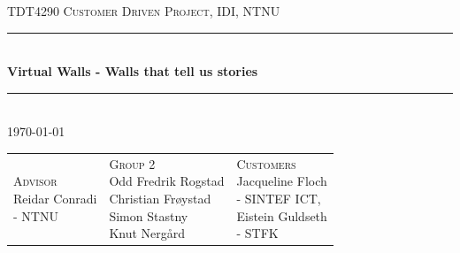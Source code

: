 \documentclass[11pt]{book}
\begin{document}
\newcommand{\fullprojectname}[0]{Virtual Walls - Walls that tell us stories}
\newcommand{\shortprojectname}[0]{Virtual Walls}
\newcommand{\systemname}[0]{StedR}
\newcommand{\wallentitys}[0]{place}
\newcommand{\wallentityp}[0]{places}
\newcommand{\wallentitypcap}[0]{Places}

\frontmatter

\begin{titlepage}
    \color{white}
    \begin{center}
        
        
        \textsc{\Large TDT4290 Customer Driven Project, IDI, NTNU}
        \\[0.5cm]
        
        \rule{\linewidth}{0.5mm}
        \\[1cm]
        
        \textbf{\LARGE \fullprojectname}
        \\[1cm]
        
        \rule{\linewidth}{0.5mm}
        \\[1.0cm]
        
        \Large{  \today}
        \\[1.5cm]

\begin{table}[H]
\centering
\begin{tabular}{ p{4cm} p{5cm} p{4cm} }
\parbox{4cm}{
\centering
    \color{white}
        \textsc{\Large Advisor}
        \\[0.1cm]
        \Large
        {
            Reidar Conradi\\
            - NTNU
        }
} & \parbox{5cm}{
\centering
    \color{white}
        \textsc{\Large Group 2}
        \\[0.1cm]
        \Large
        {
            Odd Fredrik Rogstad \\
            Christian Frøystad \\
            Simon Stastny \\
            Knut Nergård
        }
} & \parbox{4cm}{
\centering
    \color{white}
        \textsc{\Large Customers}
        \\[0.1cm]
        \Large
        {
            Jacqueline Floch\\
            - SINTEF ICT,\\
            Eistein Guldseth\\
            - STFK\\
        }
}
\end{tabular}
\end{table}
        


\end{center}
\end{titlepage}
\end{document}
